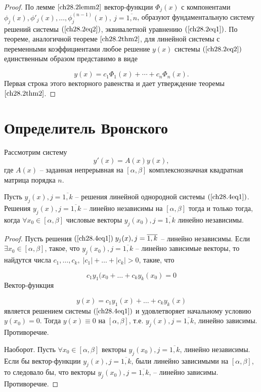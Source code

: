 \begin{proof}
По лемме $\ref{ch28.2lemm2}$ вектор-функции $\Phi_j(x)$ с компонентами $\phi_j(x), \phi'_j(x), \ldots, \phi^{(n - 1)}_j(x), \: j = \overline{1,n}$, образуют фундаментальную систему решений системы $(\ref{ch28.2eq2})$, эквивалетной уравнению $(\ref{ch28.2eq1})$. По теореме, аналогичной теореме $\ref{ch28.2thm2}$, для линейной системы с переменными коэффициентами любое решение $y(x)$ системы $(\ref{ch28.2eq2})$ единственным образом представимо в виде

$$
y(x) = c_1 \Phi_1(x) + \cdots + c_n \Phi_n(x).
$$
Первая строка этого векторного равенства и дает утверждение теоремы $\ref{ch28.2thm2}$.
\end{proof}
\section{Определитель Вронского}

Рассмотрим систему 
\begin{equation} \label{ch28.4eq1}
y'(x) = A(x)y(x),
\end{equation}
где $A(x)$ -- заданная непрерывная на $[\alpha, \beta]$ комплекснозначная квадратная матрица порядка $n$.

\begin{thm} \label{ch28.3thm1}
Пусть $y_j(x), j = \overline{1,k}$ -- решения линейной однородной системы $(\ref{ch28.4eq1})$. Решения $y_j(x), j = \overline{1,k}$ -- линейно независимы на $[\alpha, \beta]$ тогда и только тогда, когда $\forall x_0 \in [\alpha, \beta]$ числовые векторы $y_j(x_0), j = \overline{1,k}$ линейно независимы.
\end{thm}

\begin{proof}
Пусть решения $(\ref{ch28.4eq1}) \; y_j(x), j = \overline{1,k}$ -- линейно независимы. Если $\exists x_0 \in [\alpha, \beta]$, такое, что $y_j(x_0), j = \overline{1,k}$ -- линейно зависимые векторы, то найдутся числа $c_1, \ldots, c_k, \; |c_1| + \ldots + |c_k| > 0$, такие, что

$$
c_1y_1(x_0 + \ldots + c_k y_k(x_0) = 0
$$
Вектор-функция

$$
y(x) = c_1y_1(x) + \ldots + c_k y_k(x)
$$
является решением системы $(\ref{ch28.4eq1})$ и удовлетворяет начальному условию $y(x_0) = 0$. Тогда $y(x) \equiv 0$ на $[\alpha, \beta]$, т.е. $y_j(x), j = \overline{1,k}$, линейно зависимы. Противоречие.

Наоборот. Пусть $\forall x_0 \in [\alpha, \beta]$ векторы $y_j(x_0), j = \overline{1,k}$, линейно независимы. Если бы вектор-функции $y_j(x), j = \overline{1,k}$, были линейно зависимыми на $[\alpha,\beta]$, то следовало бы, что векторы $y_j(x_0), j = \overline{1,k}$, -- линейно зависимы. Противоречие.
\end{proof}

